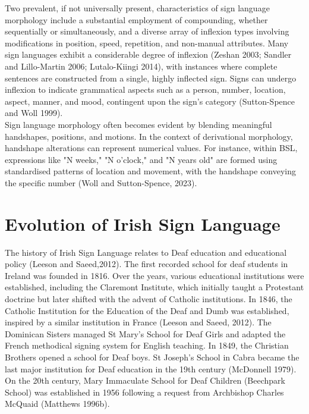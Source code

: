 Two prevalent, if not universally present, characteristics of sign language morphology include a substantial employment of compounding, whether sequentially or simultaneously, and a diverse array of inflexion types involving modifications in position, speed, repetition, and non-manual attributes. Many sign languages exhibit a considerable degree of inflexion (Zeshan 2003; Sandler and Lillo-Martin 2006; Lutalo-Kiingi 2014), with instances where complete sentences are constructed from a single, highly inflected sign. Signs can undergo inflexion to indicate grammatical aspects such as a person, number, location, aspect, manner, and mood, contingent upon the sign's category (Sutton-Spence and Woll 1999).\\

Sign language morphology often becomes evident by blending meaningful handshapes, positions, and motions. In the context of derivational morphology, handshape alterations can represent numerical values. For instance, within BSL, expressions like "N weeks," "N o'clock," and "N years old" are formed using standardised patterns of location and movement, with the handshape conveying the specific number (Woll and Sutton-Spence, 2023). 


\section{Evolution of Irish Sign Language}

 The history of Irish Sign Language relates to Deaf education and educational policy (Leeson and Saeed,2012). The first recorded school for deaf students in Ireland was founded in 1816. Over the years, various educational institutions were established, including the Claremont Institute, which initially taught a Protestant doctrine but later shifted with the advent of Catholic institutions. In 1846, the Catholic Institution for the Education of the Deaf and Dumb was established, inspired by a similar institution in France (Leeson and Saeed, 2012). The Dominican Sisters managed St Mary's School for Deaf Girls and adapted the French methodical signing system for English teaching. In 1849, the Christian Brothers opened a school for Deaf boys. St Joseph's School in Cabra became the last major institution for Deaf education in the 19th century (McDonnell 1979). On the 20th century, Mary Immaculate School for Deaf Children (Beechpark School) was established in 1956 following a request from Archbishop Charles McQuaid (Matthews 1996b).\\

